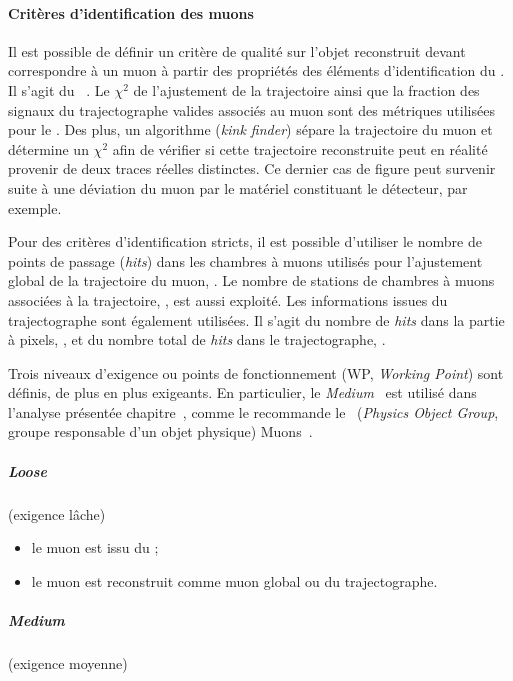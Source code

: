 \paragraph{Critères d'identification des muons}
Il est possible de définir un critère de qualité sur l'objet reconstruit devant correspondre à un muon à partir des propriétés des éléments d'identification du \PF.
Il s'agit du \muonID~\cite{CMS-MUO-16-001,cmsMediumMuon}.
Le $\chi^2$ de l'ajustement de la trajectoire ainsi que la fraction des signaux du trajectographe valides associés au muon sont des métriques utilisées pour le \muonID.
Des plus, un algorithme (\emph{kink finder}) sépare la trajectoire du muon et détermine un $\chi^2$ afin de vérifier si cette trajectoire reconstruite peut en réalité provenir de deux traces réelles distinctes.
Ce dernier cas de figure peut survenir suite à une déviation du muon par le matériel constituant le détecteur, par exemple.
\par
Pour des critères d'identification stricts, il est possible d'utiliser le nombre de points de passage (\emph{hits}) dans les chambres à muons utilisés pour l'ajustement global de la trajectoire du muon, \Nmdhits.
Le nombre de stations de chambres à muons associées à la trajectoire, \Nms, est aussi exploité.
Les informations issues du trajectographe sont également utilisées.
Il s'agit du nombre de \emph{hits} dans la partie à pixels, \Npixelhits, et du nombre total de \emph{hits} dans le trajectographe, \Ntrkhits.
\par
Trois niveaux d'exigence ou points de fonctionnement (WP, \emph{Working Point}) sont définis, de plus en plus exigeants.
En particulier, le \emph{Medium} \muonID\ est utilisé dans l'analyse présentée chapitre~, comme le recommande le \POG\ (\emph{Physics Object Group}, groupe responsable d'un objet physique) Muons~\cite{cmsMediumMuon}.
\subparagraph{\emph{Loose} \muonID} (exigence lâche)
\begin{itemize}
\item le muon est issu du \PF;
\item le muon est reconstruit comme muon global ou du trajectographe.
\end{itemize}
\subparagraph{\emph{Medium} \muonID} (exigence moyenne)
